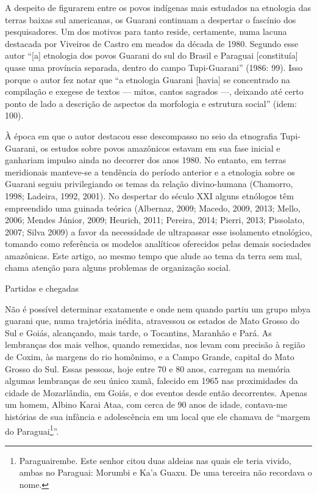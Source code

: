 \documentclass{article}
\begin{document}
A despeito de figurarem entre os povos ind\'igenas mais estudados na
etnologia das terras baixas sul americanas, os Guarani continuam a
despertar o fasc\'inio dos pesquisadores. Um dos motivos para tanto
reside, certamente, numa lacuna destacada por Viveiros de Castro em
meados da d\'ecada de 1980. Segundo esse autor {\textquotedblleft}[a]
etnologia dos povos Guarani do sul do Brasil e Paraguai [constitu\'ia]
quase uma prov\'incia separada, dentro do campo
Tupi-Guarani{\textquotedblright} (1986: 99). Isso porque o autor fez
notar que {\textquotedblleft}a etnologia Guarani [havia] se concentrado
na compila\c{c}\~ao e exegese de textos --- mitos, cantos sagrados ---,
deixando at\'e certo ponto de lado a descri\c{c}\~ao de aspectos da
morfologia e estrutura social{\textquotedblright} (idem: 100).

\`A \'epoca em que o autor destacou esse descompasso no seio da
etnografia Tupi-Guarani, os estudos sobre povos amaz\^onicos estavam em
sua fase inicial e ganhariam impulso ainda no decorrer dos anos 1980.
No entanto, em terras meridionais manteve-se a tend\^encia do per\'iodo
anterior e a etnologia sobre os Guarani seguiu privilegiando os temas
da rela\c{c}\~ao divino-humana (Chamorro, 1998; Ladeira, 1992, 2001).
No despertar do s\'eculo XXI alguns etn\'ologos t\^em empreendido uma
guinada te\'orica (Albernaz, 2009; Macedo, 2009, 2013; Mello, 2006;
Mendes J\'unior, 2009; Heurich, 2011; Pereira, 2014; Pierri, 2013;
Pissolato, 2007; Silva 2009) a favor da necessidade de ultrapassar esse
isolamento etnol\'ogico, tomando como refer\^encia os modelos
anal\'iticos oferecidos pelas demais sociedades amaz\^onicas. Este
artigo, ao mesmo tempo que alude ao tema da terra sem mal, chama
aten\c{c}\~ao para alguns problemas de organiza\c{c}\~ao social. 

Partidas e chegadas

N\~ao \'e poss\'ivel determinar exatamente e onde nem quando partiu um
grupo mbya guarani que, numa trajet\'oria in\'edita, atravessou os
estados de Mato Grosso do Sul e Goi\'as, alcan\c{c}ando, mais tarde, o
Tocantins, Maranh\~ao e Par\'a. As lembran\c{c}as dos mais velhos,
quando remexidas, nos levam com precis\~ao \`a regi\~ao de Coxim, \`as
margens do rio hom\^onimo, e a Campo Grande, capital do Mato Grosso do
Sul. Essas pessoas, hoje entre 70 e 80 anos, carregam na mem\'oria
algumas lembran\c{c}as de seu \'unico xam\~a, falecido em 1965 nas
proximidades da cidade de Mozarl\^andia, em Goi\'as, e dos eventos
desde ent\~ao decorrentes. Apenas um homem, Albino Karai Ataa, com
cerca de 90 anos de idade, contava-me hist\'orias de sua inf\^ancia e
adolesc\^encia em um local que ele chamava de {\textquotedblleft}margem
do Paraguai\footnote{ Paraguairembe. Este senhor citou duas aldeias nas
quais ele teria vivido, ambas no Paraguai: Morumbi e
Ka{\textquoteright}a Guaxu. De uma terceira n\~ao recordava o
nome.}{\textquotedblright}. 
\end{document}
